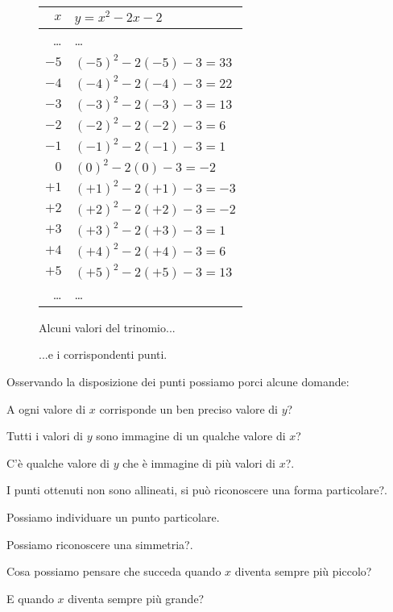 \begin{figure}[h]
 \centering
 \begin{minipage}[]{.48\textwidth}
  \begin{center}
   \begin{tabular}{r|l}
    $x$   & $y=x^2-2x-2$ \\
    \hline
    \dots & \dots \\
    $-5$ & $(-5)^2 -2(-5) -3 = 33$ \\
    $-4$ & $(-4)^2 -2(-4) -3 = 22$ \\
    $-3$ & $(-3)^2 -2(-3) -3 = 13$ \\
    $-2$ & $(-2)^2 -2(-2) -3 = 6$ \\
    $-1$ & $(-1)^2 -2(-1) -3 = 1$ \\
     $0$ & $(0)^2 -2(0) -3 = -2$ \\
    $+1$ & $(+1)^2 -2(+1) -3 = -3$ \\
    $+2$ & $(+2)^2 -2(+2) -3 = -2$ \\
    $+3$ & $(+3)^2 -2(+3) -3 = 1$ \\
    $+4$ & $(+4)^2 -2(+4) -3 = 6$ \\
    $+5$ & $(+5)^2 -2(+5) -3 = 13$ \\
    \dots & \dots \\
   \end{tabular}
  \caption{Alcuni valori del trinomio...} \label{tab:trinomio0}
  \end{center}
 \end{minipage}
\begin{minipage}[]{.48\textwidth}
\begin{center}
\begin{inaccessibleblock}
  
  \caption{...e i corrispondenti punti.} \label{fig:trinomio0}
\end{inaccessibleblock}
\end{center}
\end{minipage}
\end{figure}

Osservando la disposizione dei punti possiamo porci alcune domande:
\begin{enumerate*}
 \item A ogni valore di $x$ corrisponde un ben preciso valore di $y$?
 \item Tutti i valori di $y$ sono immagine di un qualche valore di $x$?
 \item C'è qualche valore di $y$ che è immagine di più valori di $x$?.
 \item I punti ottenuti non sono allineati, si può riconoscere una forma 
  particolare?.
 \item Possiamo individuare un punto particolare.
 \item Possiamo riconoscere una simmetria?.
 \item Cosa possiamo pensare che succeda quando $x$ diventa sempre più piccolo?
 \item E quando $x$ diventa sempre più grande?
\end{enumerate*}

